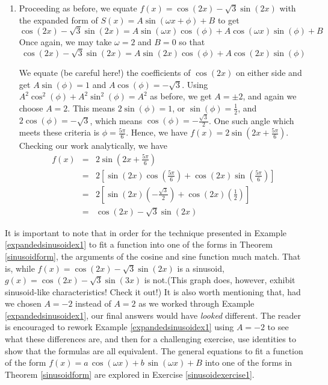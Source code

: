 {\begin{enumerate}
\item  Proceeding as before, we equate $f(x) = \cos(2x) - \sqrt{3} \sin(2x)$ with the expanded form of $S(x) = A \sin(\omega x + \phi) + B$ to get 
\[
 \cos(2x) - \sqrt{3} \sin(2x) = A\sin(\omega x) \cos(\phi) + A \cos(\omega x)\sin(\phi) + B
\]
Once again, we may take $\omega = 2$ and $B = 0$ so that 
\[
 \cos(2x) - \sqrt{3} \sin(2x) =  A\sin(2x) \cos(\phi) + A \cos(2x)\sin(\phi)
\]

We equate (be careful here!) the coefficients of $\cos(2x)$ on either side and get $A\sin(\phi) = 1$ and $A\cos(\phi) = -\sqrt{3}$.  Using $A^2\cos^{2}(\phi) + A^2\sin^{2}(\phi) = A^2$ as before, we get $A = \pm 2$, and again we choose $A = 2$.  This means $2 \sin(\phi) = 1$, or $\sin(\phi) = \frac{1}{2}$,  and $2\cos(\phi) = -\sqrt{3}$, which means $\cos(\phi) = -\frac{\sqrt{3}}{2}$.  One such angle which meets these criteria   is $\phi = \frac{5\pi}{6}$.  Hence, we have $f(x) = 2 \sin\left(2x + \frac{5\pi}{6}\right)$.  Checking our work analytically, we have 
\[
\begin{array}{rcl} f(x) &  = &  2 \sin\left(2x + \frac{5\pi}{6}\right) \\ [3pt] & = &  2 \left[ \sin(2x) \cos\left(\frac{5\pi}{6}\right) + \cos(2x) \sin\left(\frac{5\pi}{6}\right) \right]\\ [3pt] & = & 2 \left[ \sin(2x) \left(-\frac{\sqrt{3}}{2}\right) +  \cos(2x) \left(\frac{1}{2}\right)\right] \\ [3pt] & = & \cos(2x) - \sqrt{3} \sin(2x)
\end{array}
\]
\end{enumerate}
}

\medskip

It is important to note that in order for the technique presented in Example \ref{expandedsinusoidex1} to fit a function into one of the forms in Theorem \ref{sinusoidform},  the arguments of the cosine and sine function much match.  That is, while $f(x) = \cos(2x) - \sqrt{3} \sin(2x)$ is a sinusoid, $g(x) =  \cos(2x) - \sqrt{3} \sin(3x)$ is not.(This graph does, however, exhibit sinusoid-like characteristics!  Check it out!)  It is also worth mentioning that, had we chosen  $A = -2$ instead of $A = 2$ as we worked through Example \ref{expandedsinusoidex1}, our final answers would have \textit{looked} different. The reader is encouraged to rework Example  \ref{expandedsinusoidex1} using $A = -2$ to see what these differences are, and then for a challenging exercise, use identities to show that the formulas are all equivalent.  The general equations to fit a function of the form $f(x) = a \, \cos(\omega x) + b \, \sin(\omega x) + B$ into one of the forms in Theorem \ref{sinusoidform} are explored in Exercise \ref{sinusoidexercise1}.

